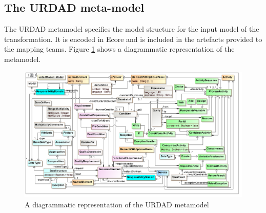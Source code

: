 \subsection{The URDAD meta-model}

The URDAD metamodel specifies the model structure for the input model of the transformation. It is encoded in Ecore and is included in the artefacts provided to the mapping teams. Figure \ref{fig:metamodel} shows a diagrammatic representation of the metamodel. 

\begin{figure}
  \centering
  \includegraphics{metamodel}
  \caption{A diagrammatic representation of the URDAD metamodel}
  \label{fig:metamodel}
\end{figure}


